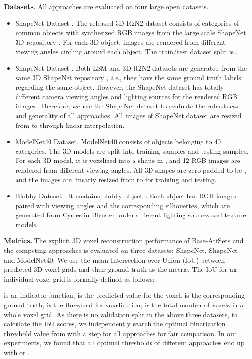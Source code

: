 \documentclass[twocolumn]{svjour3}    \pdfoutput=1
\newcommand{\ie}{\textit{i}.\textit{e}., }
\begin{document}
\textbf{Datasets.} All approaches are evaluated on four large open datasets.
\begin{itemize} [leftmargin=0.3cm]
\item ShapeNet Dataset \citep{Chan2016}. The released 3D-R2N2 dataset consists of  categories of  common objects with synthesized RGB images from the large scale ShapeNet 3D repository \citep{Chang2015}. For each 3D object,  images are rendered from different viewing angles circling around each object. The train/test dataset split is .
\item ShapeNet Dataset \citep{Kar2017}. Both LSM and 3D-R2N2 datasets are generated from the same 3D ShapeNet repository \citep{Chang2015}, \ie they have the same ground truth labels regarding the same object. However, the ShapeNet dataset has totally different camera viewing angles and lighting sources for the rendered RGB images. Therefore, we use the ShapeNet dataset to evaluate the robustness and generality of all approaches. All images of ShapeNet dataset are resized from  to  through linear interpolation.
\item ModelNet40 Dataset. ModelNet40 \citep{Wu2015} consists of  objects belonging to 40 categories. The 3D models are split into  training samples and  testing samples. For each 3D model, it is voxelized into a  shape in \citep{Qi2016a}, and 12 RGB images are rendered from different viewing angles. All 3D shapes are zero-padded to be , and the images are linearly resized from  to  for training and testing.
\item Blobby Dataset \citep{Wiles2017}. It contains  blobby objects. Each object has  RGB images paired with viewing angles and the corresponding silhouettes, which are generated from Cycles in Blender under different lighting sources and texture models. 
\end{itemize}

\textbf{Metrics.} The explicit 3D voxel reconstruction performance of Base-AttSets and the competing approaches is evaluated on three datasets: ShapeNet, ShapeNet and ModelNet40. We use the mean Intersection-over-Union (IoU) \citep{Chan2016} between predicted 3D voxel grids and their ground truth as the metric. The IoU for an individual voxel grid is formally defined as follows:
\begin{ceqn}

\end{ceqn}
  is an indicator function,  is the predicted value for the  voxel,  is the corresponding ground truth,  is the threshold for voxelization,  is the total number of voxels in a whole voxel grid. As there is no validation split in the above three datasets, to calculate the IoU scores, we independently search the optimal binarization threshold value from  with a step  for all approaches for fair comparison. In our experiments, we found that all optimal thresholds of different approaches end up with  or .
\end{document}
